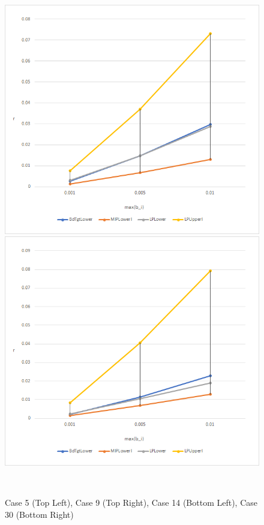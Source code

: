\documentclass[11pt]{article}
\theoremstyle{plain}
\theoremstyle{definition}
\theoremstyle{remark}
\begin{document}
\begin{figure}[h]
\begin{center}
\includegraphics[scale=0.45]{Figures/Case14}
\includegraphics[scale=0.45]{Figures/Case30}
\caption{Case 5 (Top Left), Case 9 (Top Right), Case 14 (Bottom Left), Case 30 (Bottom Right)} \ \\
\end{center}
\label{fig:Graphs1}
\end{figure} 
\end{document}
